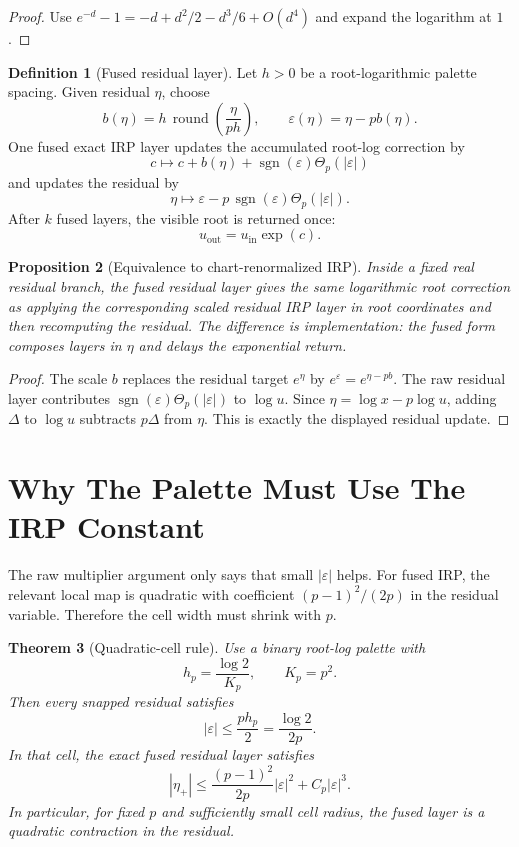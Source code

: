 \documentclass[10pt,a4paper]{article}
\theoremstyle{plain}
\newtheorem{theorem}{Theorem}[section]
\newtheorem{proposition}[theorem]{Proposition}
\theoremstyle{definition}
\newtheorem{definition}[theorem]{Definition}
\newcommand{\eps}{\varepsilon}
\begin{document}
\begin{proof}
Use $e^{-d}-1=-d+d^2/2-d^3/6+O(d^4)$ and expand the logarithm at $1$.
\end{proof}

\begin{definition}[Fused residual layer]
Let $h>0$ be a root-logarithmic palette spacing.  Given residual $\eta$, choose
\[
  b(\eta)=h\,\operatorname{round}\!\left(\frac{\eta}{ph}\right),
  \qquad
  \eps(\eta)=\eta-pb(\eta).
\]
One fused exact IRP layer updates the accumulated root-log correction by
\[
  c\mapsto c+b(\eta)+\operatorname{sgn}(\eps)\Theta_p(|\eps|)
\]
and updates the residual by
\[
  \eta\mapsto
  \eps-p\,\operatorname{sgn}(\eps)\Theta_p(|\eps|).
\]
After $k$ fused layers, the visible root is returned once:
\[
  u_{\mathrm{out}}=u_{\mathrm{in}}\exp(c).
\]
\end{definition}

\begin{proposition}[Equivalence to chart-renormalized IRP]
Inside a fixed real residual branch, the fused residual layer gives the same
logarithmic root correction as applying the corresponding scaled residual IRP
layer in root coordinates and then recomputing the residual.  The difference is
implementation: the fused form composes layers in $\eta$ and delays the
exponential return.
\end{proposition}

\begin{proof}
The scale $b$ replaces the residual target $e^\eta$ by
$e^{\eps}=e^{\eta-pb}$.  The raw residual layer contributes
$\operatorname{sgn}(\eps)\Theta_p(|\eps|)$ to $\log u$.  Since
$\eta=\log x-p\log u$, adding $\Delta$ to $\log u$ subtracts $p\Delta$ from
$\eta$.  This is exactly the displayed residual update.
\end{proof}

\section{Why The Palette Must Use The IRP Constant}

The raw multiplier argument only says that small $|\eps|$ helps.  For fused IRP,
the relevant local map is quadratic with coefficient $(p-1)^2/(2p)$ in the
residual variable.  Therefore the cell width must shrink with $p$.

\begin{theorem}[Quadratic-cell rule]
Use a binary root-log palette with
\[
  h_p=\frac{\log2}{K_p},
  \qquad K_p=p^2.
\]
Then every snapped residual satisfies
\[
  |\eps|\le \frac{p h_p}{2}
        =\frac{\log2}{2p}.
\]
In that cell, the exact fused residual layer satisfies
\[
  |\eta_+|
    \le \frac{(p-1)^2}{2p}|\eps|^2+C_p|\eps|^3.
\]
In particular, for fixed $p$ and sufficiently small cell radius, the fused layer
is a quadratic contraction in the residual.
\end{theorem}
\end{document}
